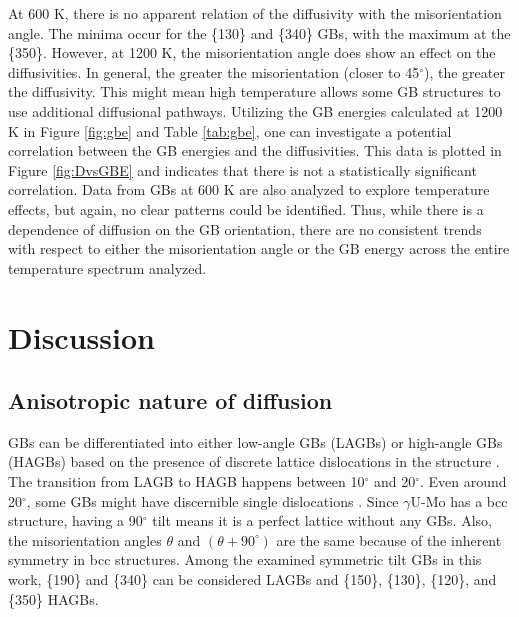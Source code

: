 \documentclass{elsarticle}
\begin{document}

At 600 K, there is no apparent relation of the diffusivity with the misorientation angle. The minima occur for the \{130\} and \{340\} GBs, with the maximum at the \{350\}. However, at 1200 K, the misorientation angle does show an effect on the diffusivities. In general, the greater the misorientation (closer to 45$^{\circ}$), the greater the diffusivity. This might mean high temperature allows some GB structures to use additional diffusional pathways. Utilizing the GB energies calculated at 1200 K in Figure \ref{fig:gbe} and Table \ref{tab:gbe}, one can investigate a potential correlation between the GB energies and the diffusivities. This data is plotted in Figure \ref{fig:DvsGBE} and indicates that there is not a statistically significant correlation. Data from GBs at 600 K \cite{beeler2018} are also analyzed to explore temperature effects, but again, no clear patterns could be identified. Thus, while there is a dependence of diffusion on the GB orientation, there are no consistent trends with respect to either the misorientation angle or the GB energy across the entire temperature spectrum analyzed.

\FloatBarrier
\section{Discussion}

\subsection{Anisotropic nature of diffusion}

GBs can be differentiated into either low-angle GBs (LAGBs) or high-angle GBs (HAGBs) based on the presence of discrete lattice dislocations in the structure \cite{winning2010}. The transition from LAGB to HAGB happens between 10$^{\circ}$ and 20$^{\circ}$. Even around 20$^{\circ}$, some GBs might have discernible single dislocations \cite{winning2005}. Since $\gamma$U-Mo has a bcc structure, having a 90$^{\circ}$ tilt means it is a perfect lattice without any GBs. Also, the misorientation angles $\theta$ and $(\theta+90^{\circ})$ are the same because of the inherent symmetry in bcc structures. Among the examined symmetric tilt GBs in this work, \{190\} and \{340\} can be considered LAGBs and \{150\}, \{130\}, \{120\}, and \{350\} HAGBs.
\end{document}
